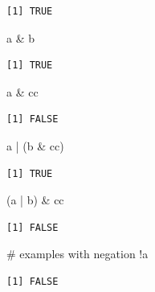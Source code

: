 \documentclass[
  letterpaper,
  DIV=11,
  numbers=noendperiod]{scrreprt}
\newenvironment{Shaded}{\begin{snugshade}}{\end{snugshade}}
\newcommand{\CommentTok}[1]{\textcolor[rgb]{0.37,0.37,0.37}{#1}}
\newcommand{\NormalTok}[1]{\textcolor[rgb]{0.00,0.23,0.31}{#1}}
\newcommand{\SpecialCharTok}[1]{\textcolor[rgb]{0.37,0.37,0.37}{#1}}
\begin{document}
\begin{verbatim}
[1] TRUE
\end{verbatim}

\begin{Shaded}
\begin{Highlighting}[]
\NormalTok{a }\SpecialCharTok{\&}\NormalTok{ b}
\end{Highlighting}
\end{Shaded}

\begin{verbatim}
[1] TRUE
\end{verbatim}

\begin{Shaded}
\begin{Highlighting}[]
\NormalTok{a }\SpecialCharTok{\&}\NormalTok{ cc}
\end{Highlighting}
\end{Shaded}

\begin{verbatim}
[1] FALSE
\end{verbatim}

\begin{Shaded}
\begin{Highlighting}[]
\NormalTok{a }\SpecialCharTok{|}\NormalTok{ (b }\SpecialCharTok{\&}\NormalTok{ cc)}
\end{Highlighting}
\end{Shaded}

\begin{verbatim}
[1] TRUE
\end{verbatim}

\begin{Shaded}
\begin{Highlighting}[]
\NormalTok{(a }\SpecialCharTok{|}\NormalTok{ b) }\SpecialCharTok{\&}\NormalTok{ cc}
\end{Highlighting}
\end{Shaded}

\begin{verbatim}
[1] FALSE
\end{verbatim}

\begin{Shaded}
\begin{Highlighting}[]
\CommentTok{\# examples with negation}
\SpecialCharTok{!}\NormalTok{a}
\end{Highlighting}
\end{Shaded}

\begin{verbatim}
[1] FALSE
\end{verbatim}
\end{document}
